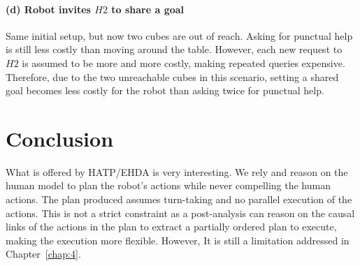 \paragraph{(d) Robot invites $H2$ to share a goal}
Same initial setup, but now two cubes are out of reach. Asking for punctual help is still less costly than moving around the table. 
However, each new request to $H2$ is assumed to be more and more costly, making repeated queries expensive.  
Therefore, due to the two unreachable cubes in this scenario, setting a shared goal becomes less costly for the robot than asking twice for punctual help.

\section{Conclusion}

What is offered by HATP/EHDA is very interesting. We rely and reason on the human model to plan the robot's actions while never compelling the human actions. The plan produced assumes turn-taking and no parallel execution of the actions. This is not a strict constraint as a post-analysis can reason on the causal links of the actions in the plan to extract a partially ordered plan to execute, making the execution more flexible. However, It is still a limitation addressed in Chapter~\ref{chap:4}.